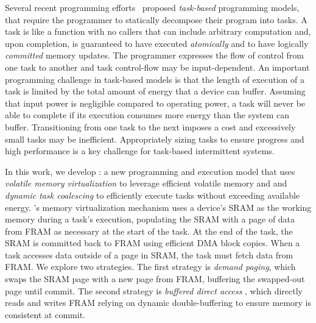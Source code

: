 
Several recent programming efforts~\cite{alpaca,chain} proposed {\em
task-based} programming models, that require the programmer to statically
decompose their program into tasks.  A task is like a function with no callers
that can include arbitrary computation and, upon completion, is guaranteed to
have executed {\em atomically} and to have logically {\em committed} memory
updates.  The programmer expresses the flow of control from one task to another
and task control-flow may be input-dependent.  An important programming
challenge in task-based models is that the length of execution of a task is
limited by the total amount of energy that a device can buffer.  Assuming that
input power is negligible compared to operating power, a task will never be
able to complete if its execution consumes more energy than the system can
buffer.  Transitioning from one task to the next imposes a cost and excessively
small tasks may be inefficient.  Appropriately sizing tasks to ensure progress
and high performance is a key challenge for task-based intermittent systems. 

In this work, we develop \sys: a new programming and execution model that uses
{\em volatile memory virtualization} to leverage efficient volatile memory and
and {\em dynamic task coalescing} to efficiently execute tasks without
exceeding available energy.  \sys's memory virtualization mechanism uses a
device's SRAM as the working memory during a task's execution, populating the
SRAM with a page of data from FRAM as necessary at the start of the task.  At
the end of the task, the SRAM is committed back to FRAM using efficient DMA
block copies.   When a task accesses data outside of a page in SRAM,
the task must fetch data from FRAM.  We explore two strategies. The first
strategy is {\em demand paging}, which swaps the SRAM page with a new page from
FRAM, buffering the swapped-out page until commit.  The second strategy is {\em
buffered direct access} , which directly reads and writes
FRAM relying on dynamic double-buffering to ensure memory is consistent at
commit.


